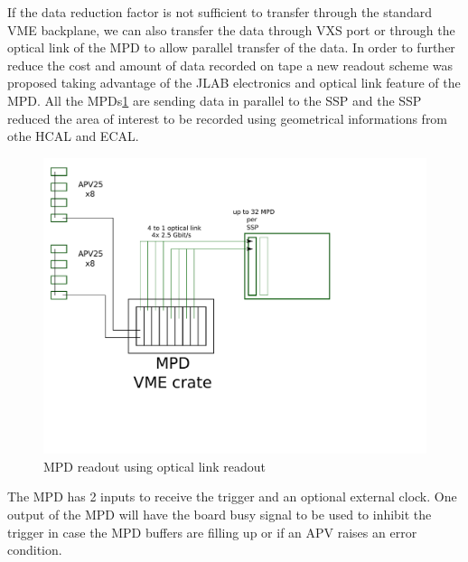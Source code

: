 \documentclass{article}
\begin{document}
If the data reduction factor is not sufficient to transfer through the standard VME backplane, we can also transfer the data through VXS port or through the optical link of the MPD to allow parallel transfer of the data.
In order to further reduce the cost and amount of data recorded on tape a new readout scheme was proposed taking advantage of the JLAB electronics and optical link feature of the MPD. All the MPDs\ref{NewMPD} are sending data in parallel to the SSP and the SSP reduced the area of interest to be recorded using geometrical informations from othe HCAL and ECAL.
\begin{figure}
\includegraphics[scale=0.55]{figs/NewMPD.pdf}
\caption{MPD readout using optical link readout}
\label{NewMPD}
\end{figure} 

The MPD has 2 inputs to receive the trigger and an optional external clock. One output of the MPD will have the board busy signal to be used to inhibit the trigger in case the MPD buffers are filling up or if an APV raises an error condition.
\end{document}
